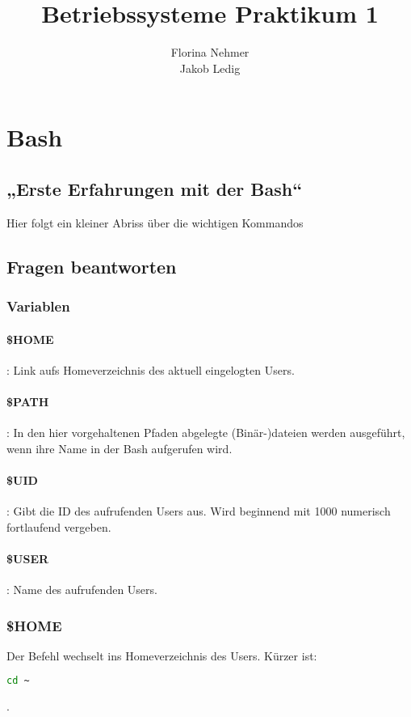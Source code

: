 \documentclass[]{scrartcl}
\title{Betriebssysteme Praktikum 1}
\author{Florina Nehmer\\
Jakob Ledig}
\begin{document}
\maketitle

\section{Bash}

\subsection{„Erste Erfahrungen mit der Bash“}
Hier folgt ein kleiner Abriss über die wichtigen Kommandos

\subsection{Fragen beantworten}
\subsubsection*{Variablen}
\paragraph{\$HOME}: Link aufs Homeverzeichnis des aktuell eingelogten Users.
\paragraph{\$PATH}: In den hier vorgehaltenen Pfaden abgelegte (Binär-)dateien werden ausgeführt, wenn ihre Name in der Bash aufgerufen wird.
\paragraph{\$UID}: Gibt die ID des aufrufenden Users aus. Wird beginnend mit 1000 numerisch fortlaufend vergeben.
\paragraph{\$USER}: Name des aufrufenden Users.

\subsubsection*{\$HOME}
Der Befehl wechselt ins Homeverzeichnis des Users. Kürzer ist:
\begin{lstlisting}[language=bash]
	cd ~
\end{lstlisting} .
\end{document}
